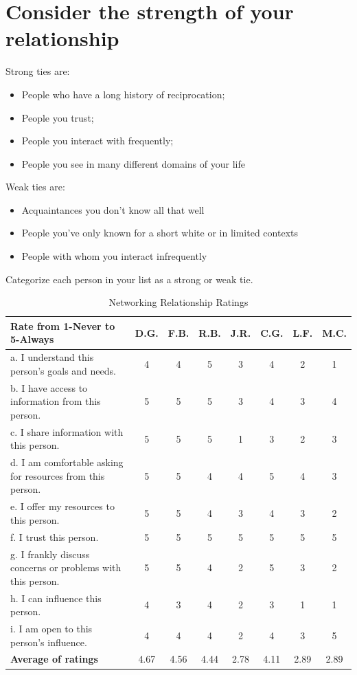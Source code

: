 \documentclass[12pt]{article}
\begin{document}
\section{Consider the strength of your relationship}

Strong ties are:
\begin{itemize}
    \item People who have a long history of reciprocation;
    \item People you trust;
    \item People you interact with frequently;
    \item People you see in many different domains of your life
\end{itemize}

Weak ties are:
\begin{itemize}
    \item Acquaintances you don't know all that well
    \item People you've only known for a short white or in limited contexts
    \item People with whom you interact infrequently
\end{itemize}

Categorize each person in your list as a strong or weak tie.

\begin{table}[h]
\centering
\small
\begin{tabular}{|p{6cm}|c|c|c|c|c|c|c|}
\hline
\textbf{Rate from 1-Never to 5-Always} & \textbf{D.G.} & \textbf{F.B.} & \textbf{R.B.} & \textbf{J.R.} & \textbf{C.G.} & \textbf{L.F.} & \textbf{M.C.} \\
\hline
a. I understand this person's goals and needs. & 4 & 4 & 5 & 3 & 4 & 2 & 1 \\
\hline
b. I have access to information from this person. & 5 & 5 & 5 & 3 & 4 & 3 & 4 \\
\hline
c. I share information with this person. & 5 & 5 & 5  & 1 & 3 & 2 & 3 \\
\hline
d. I am comfortable asking for resources from this person. & 5 & 5 & 4 & 4 & 5 & 4 & 3 \\
\hline
e. I offer my resources to this person. & 5 & 5 & 4 & 3 & 4 & 3 & 2 \\
\hline
f. I trust this person. & 5 & 5 & 5 & 5 & 5 & 5 & 5 \\
\hline
g. I frankly discuss concerns or problems with this person. & 5 & 5 & 4 & 2 & 5 & 3 & 2 \\
\hline
h. I can influence this person. & 4 & 3 & 4 & 2 & 3 & 1 & 1 \\
\hline
i. I am open to this person's influence. & 4 & 4 & 4 & 2 & 4 & 3 & 5 \\
\hline
\textbf{Average of ratings} & 4.67 & 4.56 & 4.44 & 2.78 & 4.11 & 2.89 & 2.89 \\
\hline
\end{tabular}
\caption{Networking Relationship Ratings}
\label{tab:networking}
\end{table}
\end{document}
